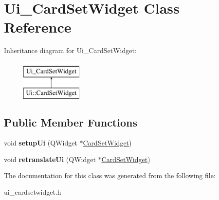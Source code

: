 \hypertarget{class_ui___card_set_widget}{}\section{Ui\+\_\+\+Card\+Set\+Widget Class Reference}
\label{class_ui___card_set_widget}
Inheritance diagram for Ui\+\_\+\+Card\+Set\+Widget\+:\begin{figure}[H]
\begin{center}
\leavevmode
\includegraphics[height=2.000000cm]{class_ui___card_set_widget}
\end{center}
\end{figure}
\subsection*{Public Member Functions}
\begin{DoxyCompactItemize}
\item 
\mbox{\label{class_ui___card_set_widget_a09c5c8e9182b53ce9aa36fc8d90c24e8}} 
void {\bfseries setup\+Ui} (Q\+Widget $\ast$\hyperlink{class_card_set_widget}{Card\+Set\+Widget})
\item 
\mbox{\label{class_ui___card_set_widget_a25c48a39c22d590848875135c01b9e8b}} 
void {\bfseries retranslate\+Ui} (Q\+Widget $\ast$\hyperlink{class_card_set_widget}{Card\+Set\+Widget})
\end{DoxyCompactItemize}


The documentation for this class was generated from the following file\+:\begin{DoxyCompactItemize}
\item 
ui\+\_\+cardsetwidget.\+h\end{DoxyCompactItemize}
